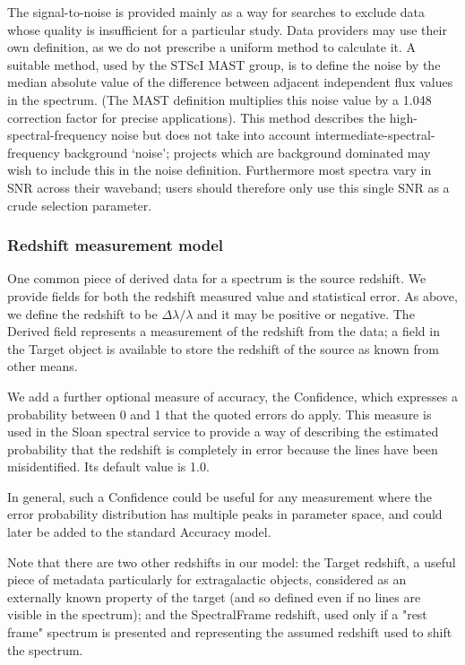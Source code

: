 \documentclass[11pt]{article}
\begin{document}
The signal-to-noise is provided mainly as a way for searches to
exclude data whose quality is insufficient for a particular
study. Data providers may use their own definition, as we do not
prescribe a uniform method to calculate it. A suitable method,
used by the STScI MAST group, is to define the noise by
the median absolute value of the 
difference between adjacent independent flux values
in the spectrum. (The MAST definition multiplies this noise
value by a 1.048 correction factor for precise applications).
This method describes the high-spectral-frequency noise
but does not take into account intermediate-spectral-frequency 
background `noise'; projects which are background dominated
may wish to include this in the noise definition. Furthermore
most spectra vary in SNR across their waveband; users
should therefore only use this single SNR as a crude selection
parameter.


\subsubsection{Redshift measurement model}  

One common piece of derived data for a spectrum is the source redshift.
We provide fields for both the redshift measured value and statistical error.
As above, we define the redshift to be $\Delta\lambda/\lambda$ and it
may be positive or negative. The Derived field represents a measurement
of the redshift from the data; a field in the Target object is available
to store the redshift of the source as known from other means. 

We add a further optional measure of accuracy, the Confidence, which expresses
a probability between 0 and 1 that the quoted errors do apply. This measure
is used in the Sloan spectral service to provide a way of describing the
estimated probability that the redshift is completely in error because
the lines have been misidentified. Its default value is 1.0.

In general, such a Confidence could be useful for any measurement where
the error probability distribution has multiple peaks in parameter
space, and could later be added to the standard Accuracy model.

Note that there are two other redshifts in our model: the Target redshift,
a useful piece of metadata particularly for extragalactic objects,
considered as an externally known property of the target (and so defined
even if no lines are visible in the spectrum); and the SpectralFrame
redshift, used only if a "rest frame" spectrum is presented and
representing the assumed redshift used to shift the spectrum.
\end{document}
